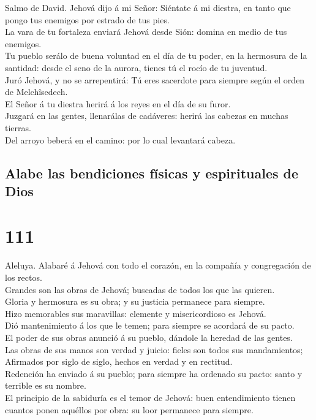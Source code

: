  Salmo de David. Jehová dijo á mi Señor: Siéntate á mi
diestra, en tanto que pongo tus enemigos por estrado de tus pies.\\
 La vara de tu fortaleza enviará Jehová desde Sión: domina
en medio de tus enemigos.\\
 Tu pueblo serálo de buena voluntad en el día de tu poder,
en la hermosura de la santidad: desde el seno de la aurora, tienes tú el
rocío de tu juventud.\\
 Juró Jehová, y no se arrepentirá: Tú eres sacerdote para
siempre según el orden de Melchîsedech.\\
 El Señor á tu diestra herirá á los reyes en el día de su
furor.\\
 Juzgará en las gentes, llenarálas de cadáveres: herirá
las cabezas en muchas tierras.\\
 Del arroyo beberá en el camino: por lo cual levantará
cabeza.

\hypertarget{alabe-las-bendiciones-fuxedsicas-y-espirituales-de-dios}{%
\subsection{Alabe las bendiciones físicas y espirituales de
Dios}\label{alabe-las-bendiciones-fuxedsicas-y-espirituales-de-dios}}

\hypertarget{section-19-111}{%
\section{111}\label{section-19-111}}

 Aleluya. Alabaré á Jehová con todo el corazón, en la
compañía y congregación de los rectos.\\
 Grandes son las obras de Jehová; buscadas de todos los
que las quieren.\\
 Gloria y hermosura es su obra; y su justicia permanece
para siempre.\\
 Hizo memorables sus maravillas: clemente y misericordioso
es Jehová.\\
 Dió mantenimiento á los que le temen; para siempre se
acordará de su pacto.\\
 El poder de sus obras anunció á su pueblo, dándole la
heredad de las gentes.\\
 Las obras de sus manos son verdad y juicio: fieles son
todos sus mandamientos;\\
 Afirmados por siglo de siglo, hechos en verdad y en
rectitud.\\
 Redención ha enviado á su pueblo; para siempre ha
ordenado su pacto: santo y terrible es su nombre.\\
 El principio de la sabiduría es el temor de Jehová: buen
entendimiento tienen cuantos ponen aquéllos por obra: su loor permanece
para siempre.

